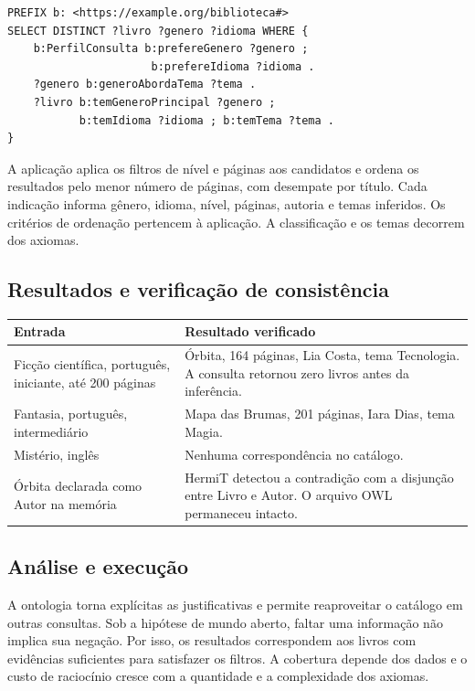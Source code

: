 \documentclass[12pt,a4paper]{article}
\begin{document}
\begin{lstlisting}
PREFIX b: <https://example.org/biblioteca#>
SELECT DISTINCT ?livro ?genero ?idioma WHERE {
    b:PerfilConsulta b:prefereGenero ?genero ;
                      b:prefereIdioma ?idioma .
    ?genero b:generoAbordaTema ?tema .
    ?livro b:temGeneroPrincipal ?genero ;
           b:temIdioma ?idioma ; b:temTema ?tema .
}
\end{lstlisting}

A aplicação aplica os filtros de nível e páginas aos candidatos e ordena os resultados pelo menor número de páginas, com desempate por título. Cada indicação informa gênero, idioma, nível, páginas, autoria e temas inferidos. Os critérios de ordenação pertencem à aplicação. A classificação e os temas decorrem dos axiomas.

\subsection{Resultados e verificação de consistência}

\begin{table}[htbp]
    \centering
    \begin{tabular}{>{\raggedright\arraybackslash}p{6.2cm} >{\raggedright\arraybackslash}p{8.6cm}}
        \toprule
        \textbf{Entrada} & \textbf{Resultado verificado} \\
        \midrule
        Ficção científica, português, iniciante, até 200 páginas & Órbita, 164 páginas, Lia Costa, tema Tecnologia. A consulta retornou zero livros antes da inferência. \\
        \addlinespace
        Fantasia, português, intermediário & Mapa das Brumas, 201 páginas, Iara Dias, tema Magia. \\
        \addlinespace
        Mistério, inglês & Nenhuma correspondência no catálogo. \\
        \addlinespace
        Órbita declarada como Autor na memória & HermiT detectou a contradição com a disjunção entre Livro e Autor. O arquivo OWL permaneceu intacto. \\
        \bottomrule
    \end{tabular}
\end{table}

\subsection{Análise e execução}

A ontologia torna explícitas as justificativas e permite reaproveitar o catálogo em outras consultas. Sob a hipótese de mundo aberto, faltar uma informação não implica sua negação. Por isso, os resultados correspondem aos livros com evidências suficientes para satisfazer os filtros. A cobertura depende dos dados e o custo de raciocínio cresce com a quantidade e a complexidade dos axiomas.
\end{document}
